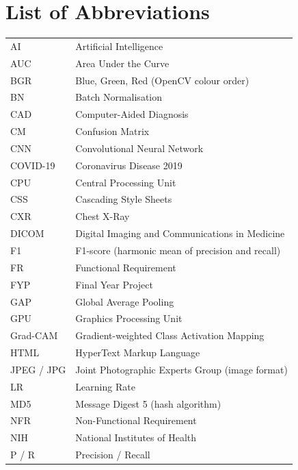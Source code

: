 {\let\cleardoublepage\clearpage \chapter*{List of Abbreviations}}
\begin{center}
\small
\renewcommand{\arraystretch}{1.0}
\begin{tabular}{|P{3.2cm}|P{10.5cm}|}
\hline
{} &  \\
\hline
AI & Artificial Intelligence \\
\hline
AUC & Area Under the Curve \\
\hline
BGR & Blue, Green, Red (OpenCV colour order) \\
\hline
BN & Batch Normalisation \\
\hline
CAD & Computer-Aided Diagnosis \\
\hline
CM & Confusion Matrix \\
\hline
CNN & Convolutional Neural Network \\
\hline
COVID-19 & Coronavirus Disease 2019 \\
\hline
CPU & Central Processing Unit \\
\hline
CSS & Cascading Style Sheets \\
\hline
CXR & Chest X-Ray \\
\hline
DICOM & Digital Imaging and Communications in Medicine \\
\hline
F1 & F1-score (harmonic mean of precision and recall) \\
\hline
FR & Functional Requirement \\
\hline
FYP & Final Year Project \\
\hline
GAP & Global Average Pooling \\
\hline
GPU & Graphics Processing Unit \\
\hline
Grad-CAM & Gradient-weighted Class Activation Mapping \\
\hline
HTML & HyperText Markup Language \\
\hline
JPEG / JPG & Joint Photographic Experts Group (image format) \\
\hline
LR & Learning Rate \\
\hline
MD5 & Message Digest 5 (hash algorithm) \\
\hline
NFR & Non-Functional Requirement \\
\hline
NIH & National Institutes of Health \\
\hline
P / R & Precision / Recall \\

\end{tabular}
\end{center}
